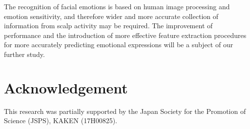 \documentclass[fonts]{icst}
\begin{document}
The recognition of facial emotions is based on human image processing and
emotion sensitivity, and therefore wider and more accurate collection of
information from scalp activity may be required. 
The improvement of performance and the introduction of more effective
feature extraction procedures for 
more accurately predicting emotional expressions will be a subject of
our further study.   

\section*{Acknowledgement}
This research was partially supported by 
the Japan Society for the Promotion of Science (JSPS), 
KAKEN (17H00825).



\end{document}
